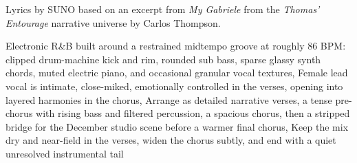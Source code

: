 
\begin{notes}
Lyrics by SUNO based on an excerpt from \emph{My Gabriele} from the \emph{Thomas’ Entourage} narrative universe by Carlos Thompson.
\end{notes}
\begin{style}
Electronic R\&B built around a restrained midtempo groove at roughly 86 BPM: clipped drum-machine kick and rim, rounded sub bass, sparse glassy synth chords, muted electric piano, and occasional granular vocal textures, Female lead vocal is intimate, close-miked, emotionally controlled in the verses, opening into layered harmonies in the chorus, Arrange as detailed narrative verses, a tense pre-chorus with rising bass and filtered percussion, a spacious chorus, then a stripped bridge for the December studio scene before a warmer final chorus, Keep the mix dry and near-field in the verses, widen the chorus subtly, and end with a quiet unresolved instrumental tail
\end{style}
